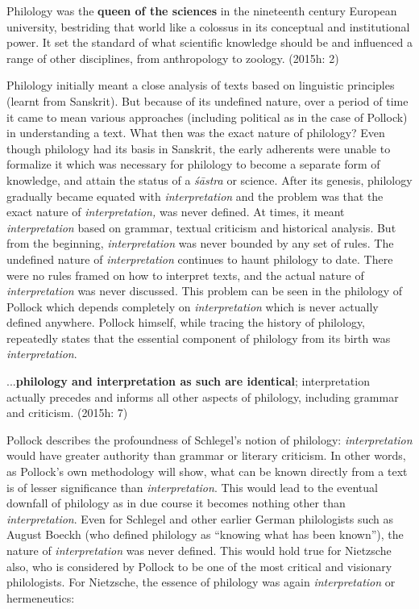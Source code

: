 \begin{myquote}
Philology was the \textbf{queen of the sciences} in the nineteenth century European university, bestriding that world like a colossus in its conceptual and institutional power. It set the standard of what scientific knowledge should be and influenced a range of other disciplines, from anthropology to zoology. (2015h: 2)
\end{myquote}

Philology initially meant a close analysis of texts based on linguistic principles (learnt from Sanskrit). But because of its undefined nature, over a period of time it came to mean various approaches (including political as in the case of Pollock) in understanding a text. What then was the exact nature of philology? Even though philology had its basis in Sanskrit, the early adherents were unable to formalize it which was necessary for philology to become a separate form of knowledge, and attain the status of a \textit{śāstra} or science. After its genesis, philology gradually became equated with \textit{interpretation} and the problem was that the exact nature of \textit{interpretation,} was never defined. At times, it meant \textit{interpretation} based on grammar, textual criticism and historical analysis. But from the beginning,\textit{ interpretation} was never bounded by any set of rules. The undefined nature of \textit{interpretation} continues to haunt philology to date. There were no rules framed on how to interpret texts, and the actual nature of \textit{interpretation} was never discussed. This problem can be seen in the philology of Pollock which depends completely on \textit{interpretation} which is never actually defined anywhere. Pollock himself, while tracing the history of philology, repeatedly states that the essential component of philology from its birth was \textit{interpretation}.

\begin{myquote}
...\textbf{philology and interpretation as such are identical}; interpretation actually precedes and informs all other aspects of philology, including grammar and criticism. (2015h: 7)
\end{myquote}

Pollock describes the profoundness of Schlegel’s notion of philology: \textit{interpretation} would have greater authority than grammar or literary criticism. In other words, as Pollock’s own methodology will show, what can be known directly from a text is of lesser significance than \textit{interpretation}. This would lead to the eventual downfall of philology as in due course it becomes nothing other than \textit{interpretation}. Even for Schlegel and other earlier German philologists such as August Boeckh (who defined philology as “knowing what has been known”), the nature of \textit{interpretation} was never defined. This would hold true for Nietzsche also, who is considered by Pollock to be one of the most critical and visionary philologists. For Nietzsche, the essence of philology was again \textit{interpretation} or hermeneutics:

